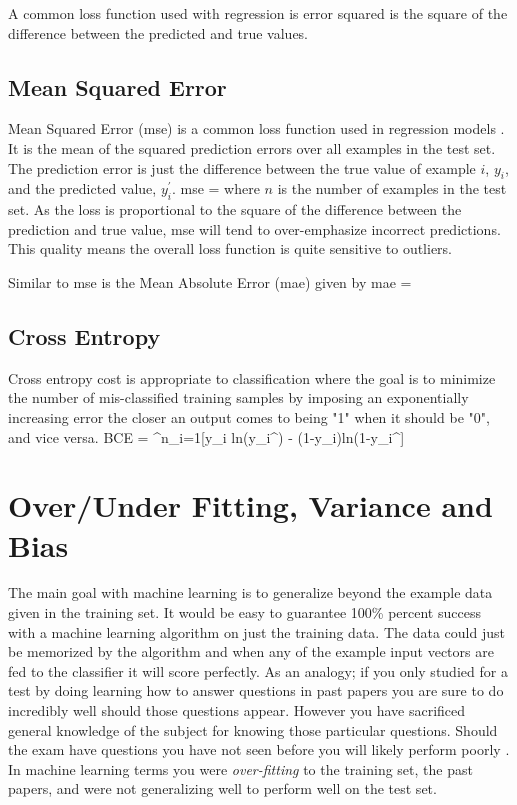 A common loss function used with regression is error squared is the square of the difference between the predicted and true values.


	\subsection{Mean Squared Error}

Mean Squared Error (mse) is a common loss function used in regression models .
It is the mean of the squared prediction errors over all examples in the test set.
The prediction error is just the difference between the true value of example $i$, $y_i$, and the predicted value, $y_i^\prime$.
\be
mse =  
\ee
where $n$ is the number of examples in the test set.
As the loss is proportional to the square of the difference between the prediction and true value, mse will tend to over-emphasize incorrect predictions.
This quality means the overall loss function is quite sensitive to outliers.

Similar to mse is the Mean Absolute Error (mae) given by
\be
mae = 
\ee

	\subsection{Cross Entropy}

Cross entropy cost is appropriate to classification where the goal is to minimize the number of mis-classified training samples by imposing an exponentially increasing error the closer an output comes to being "1" when it should be "0", and vice versa\citep{mannor2005cross}.
\be
BCE = \sum^n_{i=1}[y_i ln(y_i^\prime) - (1-y_i)ln(1-y_i^\prime]
\ee

\section{Over/Under Fitting, Variance and Bias}

The main goal with machine learning is to generalize beyond the example data given in the training set.
It would be easy to guarantee 100\% percent success with a machine learning algorithm on just the training data.
The data could just be memorized by the algorithm and when any of the example input vectors are fed to the classifier it will score perfectly.
As an analogy; if you only studied for a test by doing learning how to answer questions in past papers you are sure to do incredibly well should those questions appear.
However you have sacrificed general knowledge of the subject for knowing those particular questions.
Should the exam have questions you have not seen before you will likely perform poorly \citep{flach2012machine}.
In machine learning terms you were \textit{over-fitting} to the training set, the past papers, and were not generalizing well to perform well on the test set.

